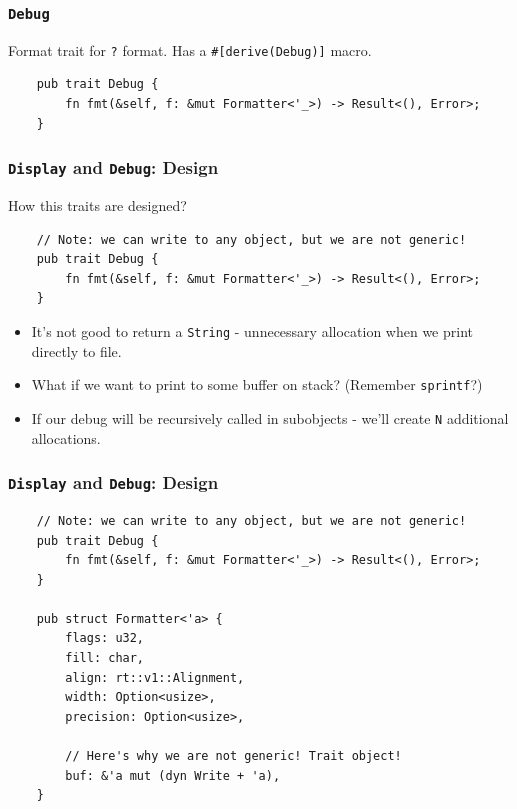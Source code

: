 \documentclass[aspectratio=1610,t]{beamer}
\begin{document}

\begin{frame}[fragile]
\frametitle{\texttt{Debug}}
Format trait for \texttt{?} format. Has a \texttt{\#[derive(Debug)]} macro.

\begin{verbatim}
    pub trait Debug {
        fn fmt(&self, f: &mut Formatter<'_>) -> Result<(), Error>;
    }
\end{verbatim}
\end{frame}


\begin{frame}[fragile]
\frametitle{\texttt{Display} and \texttt{Debug}: Design}
How this traits are designed?

\begin{verbatim}
    // Note: we can write to any object, but we are not generic!
    pub trait Debug {
        fn fmt(&self, f: &mut Formatter<'_>) -> Result<(), Error>;
    }
\end{verbatim}

\begin{itemize}
    \item It's not good to return a \texttt{String} - unnecessary allocation when we print directly to file.
    \item What if we want to print to some buffer on stack? (Remember \texttt{sprintf}?)
    \item If our debug will be recursively called in subobjects - we'll create \texttt{N} additional allocations.
\end{itemize}
\end{frame}


\begin{frame}[fragile]
\frametitle{\texttt{Display} and \texttt{Debug}: Design}
\begin{verbatim}
    // Note: we can write to any object, but we are not generic!
    pub trait Debug {
        fn fmt(&self, f: &mut Formatter<'_>) -> Result<(), Error>;
    }

    pub struct Formatter<'a> {
        flags: u32,
        fill: char,
        align: rt::v1::Alignment,
        width: Option<usize>,
        precision: Option<usize>,

        // Here's why we are not generic! Trait object!
        buf: &'a mut (dyn Write + 'a),
    }
\end{verbatim}
\end{frame}
\end{document}
